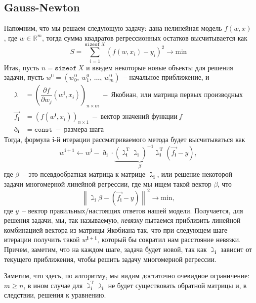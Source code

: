 \documentclass[12pt, a4paper, oneside, final]{article}
\begin{document}
	\subsection*{Gauss-Newton}
	Напомним, что мы решаем следующую задачу: дана нелинейная модель $f(w, x)$, где $w \in \mathbb{R}^{m}$, тогда сумма квадратов регрессионных остатков высчитывается как
	\[
		S = \sum\limits_{i = 1}^{\texttt{sizeof}~X}{(f(w, x_{i}) - y_{i})^2} \to \mathrm{min}
	\]
	Итак, пусть $n = \texttt{sizeof}~X$ и введем некоторые новые объекты для решения задачи, пусть $w^{0} = (w_{0}^{0}, ~ w_{1}^{0}, ~ \ldots, ~ w^{0}_{m})$~-- начальное приближение, и
	\begin{align*}
		\gimel &= \left(\dfrac{\partial{f}}{\partial{w_{j}}}{(w^{\mathbf{i}}, x_{i})}\right)_{n \times m}~-~\text{Якобиан, или матрица первых производных} \\
		\vec{f_{\mathbf{i}}} &= \left(f(w^{\mathbf{i}}, x_{i})\right)_{n \times 1}~-~\text{вектор значений функции}~f \\
		\eth_{\mathbf{i}} &= \texttt{const}~-~\text{размера шага}
	\end{align*}
	Тогда, формула $\mathbf{i}$-й итерации рассматриваемого метода будет высчитываться как
	\[
		w^{\mathbf{i} + 1} \gets w^{\mathbf{i}} - \eth_{\mathbf{i}} \cdot \underbrace{\left(\gimel^{\mathrm{T}}_{\mathbf{i}}\gimel_{\mathbf{i}}\right)^{-1}\gimel_{\mathbf{i}}^{\mathrm{T}}}_{\beta}(\vec{f_{\mathbf{i}}} - y),
	\] где $\beta$~-- это псевдообратная матрица к матрице $\gimel_{\mathbf{i}}$, или решение некоторой задачи многомерной линейной регрессии, где мы ищем такой вектор $\beta$, что
	\[
		\left\|\gimel_{\mathbf{i}}\beta - (\vec{f_{\mathbf{i}}} - y)\right\|^{2} \to \mathrm{min},
	\] где $y$~-- вектор правильных/настоящих ответов нашей модели.
	Получается, для решения задачи, мы, так называемую, \textit{невязку} пытаемся приблизить линейной комбинацией вектора из матрицы Якобиана так, что при следующем шаге итерации получить такой $w^{\mathbf{i} + 1}$, который бы сократил нам расстояние невязки.
	Причем, заметим, что на каждом шаге, задача будет новой, так как $\gimel_{\mathbf{i}}$ зависит от текущего приближения, чтобы решить задачу многомерной регрессии.

	Заметим, что здесь, по алгоритму, мы видим достаточно очевидное ограничение: $m \geqslant n$, в ином случае для $\gimel_{\mathbf{i}}^{\mathrm{T}}\gimel_{\mathbf{i}}$ не будет существовать обратной матрицы и, в следствии, решения к уравнению.
\end{document}
